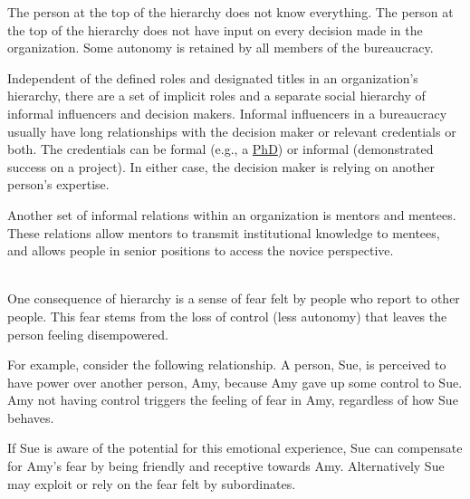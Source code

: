 The person at the top of the hierarchy does not know everything. The person at the top of the hierarchy does not have input on every decision made in the organization. Some autonomy is retained by all members of the bureaucracy.

Independent of the defined roles and designated titles in an organization's hierarchy, there are a set of implicit roles and a separate social hierarchy of informal influencers and decision makers. Informal influencers in a bureaucracy usually have long relationships with the decision maker or relevant credentials or both. The credentials can be formal (e.g., a \href{https://en.wikipedia.org/wiki/Doctor_of_Philosophy}{PhD}) or informal (demonstrated success on a project). In either case, the decision maker is relying on another person's expertise. 

Another set of informal relations within an organization is mentors and mentees. These relations allow mentors to transmit institutional knowledge to mentees, and allows people in senior positions to access the novice perspective. 


\ \\

One consequence of hierarchy is a sense of fear felt by people who report to other people. This fear stems from the loss of control (less autonomy) that leaves the person feeling disempowered. 

For example, consider the following relationship. A person, Sue, is perceived to have power over another person, Amy, because Amy gave up some control to Sue. Amy not having control triggers the feeling of fear in Amy, regardless of how Sue behaves. 

If Sue is aware of the potential for this emotional experience, Sue can compensate for Amy's fear by being friendly and receptive towards Amy. Alternatively Sue may exploit or rely on the fear felt by subordinates. 





